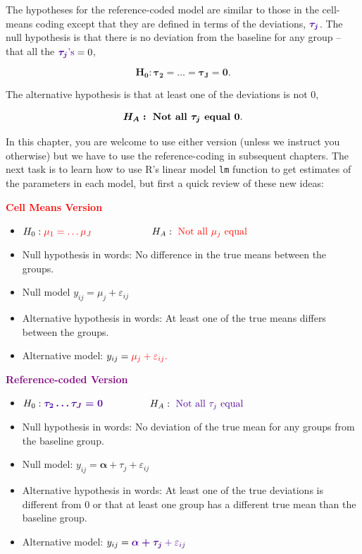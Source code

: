 \documentclass[]{book}
\theoremstyle{definition}
\theoremstyle{definition}
\theoremstyle{remark}
\begin{document}
The hypotheses for the reference-coded model are similar to those in the
cell-means coding except that they are defined in terms of the
deviations, \({\color{purple}{\boldsymbol{\tau_j}}}\). The null
hypothesis is that there is no deviation from the baseline for any group
-- that all the \({\color{purple}{\boldsymbol{\tau_j\text{'s}}}}=0\),

\[\boldsymbol{H_0: \tau_2=\ldots=\tau_J=0}.\]

The alternative hypothesis is that at least one of the deviations is not
0,

\[\boldsymbol{H_A:} \textbf{ Not all } \boldsymbol{\tau_j} \textbf{ equal } \bf{0}.\]

In this chapter, you are welcome to use either version (unless we
instruct you otherwise) but we have to use the reference-coding in
subsequent chapters. The next task is to learn how to use R's linear
model \texttt{lm} function to get estimates of the parameters in each
model, but first a quick review of these new ideas:

\textcolor{red}{\textbf{Cell Means Version}}

\begin{itemize}
\item
  \(H_0: {\color{red}{\mu_1=\ldots\mu_J}}\) ~~~~~~~ ~~~
  \(H_A: {\color{red}{\text{ Not all } \mu_j \text{ equal}}}\)
\item
  Null hypothesis in words: No difference in the true means between the
  groups.
\item
  Null model \(y_{ij} = \mu_j+\varepsilon_{ij}\)
\item
  Alternative hypothesis in words: At least one of the true means
  differs between the groups.
\item
  Alternative model: \(y_{ij} = \color{red}{\mu_j}+\varepsilon_{ij}.\)
\end{itemize}

\textcolor{purple}{\textbf{Reference-coded Version}}

\begin{itemize}
\item
  \(H_0: \color{purple}{\boldsymbol{\tau_2 \ldots \tau_J = 0}}\)
  ~~~~~~~~
  \(H_A: \color{purple}{\text{ Not all } \tau_j \text{ equal}}\)
\item
  Null hypothesis in words: No deviation of the true mean for any groups
  from the baseline group.
\item
  Null model: \(y_{ij} =\boldsymbol{\alpha} + \tau_j+\varepsilon_{ij}\)
\item
  Alternative hypothesis in words: At least one of the true deviations
  is different from 0 or that at least one group has a different true
  mean than the baseline group.
\item
  Alternative model:
  \(y_{ij} =\color{purple}{\boldsymbol{\alpha + \tau_j}}+\varepsilon_{ij}\)
\end{itemize}
\end{document}
